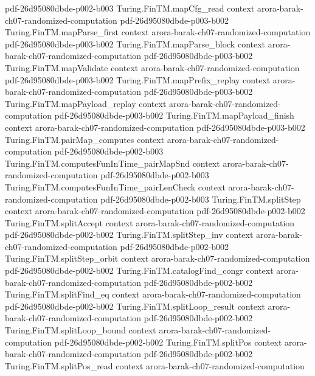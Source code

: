 \begin{theorem}
  {pdf-26d95080dbde-p002-b003}
\proofstep
  {Turing.FinTM.mapCfg_read}
  {context}
  {arora-barak-ch07-randomized-computation}
  {pdf-26d95080dbde-p003-b002}
\proofstep
  {Turing.FinTM.mapParse_first}
  {context}
  {arora-barak-ch07-randomized-computation}
  {pdf-26d95080dbde-p003-b002}
\proofstep
  {Turing.FinTM.mapParse_block}
  {context}
  {arora-barak-ch07-randomized-computation}
  {pdf-26d95080dbde-p003-b002}
\proofstep
  {Turing.FinTM.mapValidate}
  {context}
  {arora-barak-ch07-randomized-computation}
  {pdf-26d95080dbde-p003-b002}
\proofstep
  {Turing.FinTM.mapPrefix_replay}
  {context}
  {arora-barak-ch07-randomized-computation}
  {pdf-26d95080dbde-p003-b002}
\proofstep
  {Turing.FinTM.mapPayload_replay}
  {context}
  {arora-barak-ch07-randomized-computation}
  {pdf-26d95080dbde-p003-b002}
\proofstep
  {Turing.FinTM.mapPayload_finish}
  {context}
  {arora-barak-ch07-randomized-computation}
  {pdf-26d95080dbde-p003-b002}
\proofstep
  {Turing.FinTM.pairMap_computes}
  {context}
  {arora-barak-ch07-randomized-computation}
  {pdf-26d95080dbde-p002-b003}
\proofstep
  {Turing.FinTM.computesFunInTime_pairMapSnd}
  {context}
  {arora-barak-ch07-randomized-computation}
  {pdf-26d95080dbde-p002-b003}
\proofstep
  {Turing.FinTM.computesFunInTime_pairLenCheck}
  {context}
  {arora-barak-ch07-randomized-computation}
  {pdf-26d95080dbde-p002-b003}
\proofstep
  {Turing.FinTM.splitStep}
  {context}
  {arora-barak-ch07-randomized-computation}
  {pdf-26d95080dbde-p002-b002}
\proofstep
  {Turing.FinTM.splitAccept}
  {context}
  {arora-barak-ch07-randomized-computation}
  {pdf-26d95080dbde-p002-b002}
\proofstep
  {Turing.FinTM.splitStep_inv}
  {context}
  {arora-barak-ch07-randomized-computation}
  {pdf-26d95080dbde-p002-b002}
\proofstep
  {Turing.FinTM.splitStep_orbit}
  {context}
  {arora-barak-ch07-randomized-computation}
  {pdf-26d95080dbde-p002-b002}
\proofstep
  {Turing.FinTM.catalogFind_congr}
  {context}
  {arora-barak-ch07-randomized-computation}
  {pdf-26d95080dbde-p002-b002}
\proofstep
  {Turing.FinTM.splitFind_eq}
  {context}
  {arora-barak-ch07-randomized-computation}
  {pdf-26d95080dbde-p002-b002}
\proofstep
  {Turing.FinTM.splitLoop_result}
  {context}
  {arora-barak-ch07-randomized-computation}
  {pdf-26d95080dbde-p002-b002}
\proofstep
  {Turing.FinTM.splitLoop_bound}
  {context}
  {arora-barak-ch07-randomized-computation}
  {pdf-26d95080dbde-p002-b002}
\proofstep
  {Turing.FinTM.splitPos}
  {context}
  {arora-barak-ch07-randomized-computation}
  {pdf-26d95080dbde-p002-b002}
\proofstep
  {Turing.FinTM.splitPos_read}
  {context}
  {arora-barak-ch07-randomized-computation}

\end{theorem}
